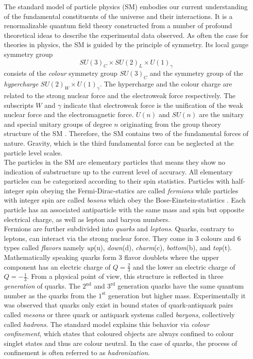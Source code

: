 The standard model of particle physics (SM) embodies our current understanding of the fundamental constituents of the universe and their interactions. It is a renormalizable quantum field theory constructed from a number of profound theoretical ideas to describe the experimental data observed. As often the case for theories in physics, the SM is guided by the principle of symmetry. Its local gauge symmetry group
\begin{equation*}
SU(3)_{C} \times SU(2)_{L} \times U(1)_{\gamma}
\end{equation*}
consists of the \textit{colour} symmetry group $SU(3)_{C}$ and the symmetry group of the \textit{hypercharge} $SU(2)_{W} \times U(1)_{\gamma}$. The hypercharge and the colour charge are related to the strong nuclear force and the electroweak force respectively. The subscripts $W$ and $\gamma$ indicate that electroweak force is the unification \cite{ModernPP} of the weak nuclear force and the electromagnetic force. $U(n)$ and $SU(n)$ are the unitary and special unitary groups of degree $n$ originating from the group theory structure of the SM \cite{GT}. Therefore, the SM contains two of the fundamental forces of nature. Gravity, which is the third fundamental force can be neglected at the particle level scales. \\
The particles in the SM are elementary particles that means they show no indication of substructure up to the current level of accuracy. All elementary particles can be categorized according to their spin statistics. Particles with half-integer spin obeying the Fermi-Dirac-statics are called \textit{fermions} while particles with integer spin are called \textit{bosons} which obey the Bose-Einstein-statistics \cite{FDStat}. Each particle has an associated antiparticle with the same mass and spin but opposite electrical charge, as well as lepton and baryon numbers. \\
Fermions are further subdivided into \textit{quarks} and \textit{leptons}. Quarks, contrary to leptons, can interact via the strong nuclear force. 
They come in 3 colours and 6 types called \textit{flavors} namely \textit{up}(u), \textit{down}(d), \textit{charm}(c), \textit{bottom}(b), and \textit{top}(t). Mathematically speaking quarks form 3 flavor doublets where the upper component has an electric charge of $Q=\frac{2}{3}$ and the lower an electric charge of $Q=-\frac{1}{3}$. From a physical point of view, this structure is reflected in three \textit{generation} of quarks. The $2^{\text{nd}}$ and $3^{\text{rd}}$ generation quarks have the same quantum number as the quarks from the $1^{\text{st}}$ generation but higher mass. Experimentally it was observed that quarks only exist in bound states of quark-antiquark pairs called \textit{mesons} or three quark or antiquark systems called \textit{baryons}, collectively called \textit{hadrons}. The standard model explains this behavior via \textit{colour confinement}, which states that coloured objects are always confined to colour singlet states and thus are colour neutral. In the case of quarks, the process of confinement is often referred to as \textit{hadronization}. \\
